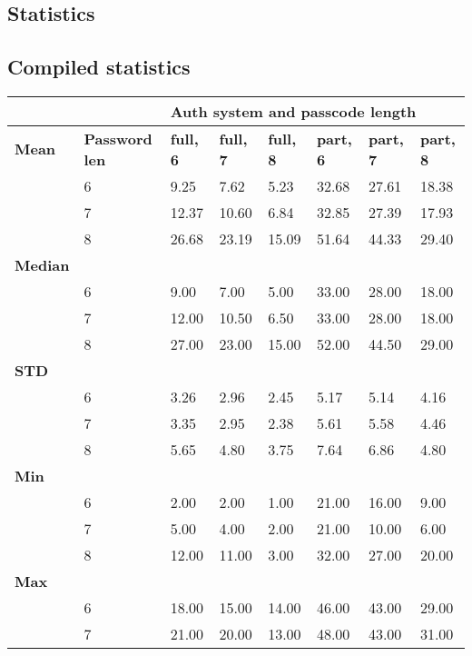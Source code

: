 \documentclass[british,11pt,a4paper]{article}
\begin{document}
\begin{appendices}
	\section{Statistics}\label{app:extra_stats}
	\subsection{Compiled statistics}
	\begin{table}[!htb]
		\centering
		\begin{tabular}{|l|l|l|l|l|l|l|l|}
		\hline
		& & \multicolumn{6}{l|}{\textbf{Auth system and passcode length}} \\ \hline
		\textbf{Mean} & \textbf{Password len} & \textbf{full, 6} & \textbf{full, 7} & \textbf{full, 8} & \textbf{part, 6} & \textbf{part, 7} & \textbf{part, 8} \\ \hline
		 & 6 & 9.25 & 7.62 & 5.23 & 32.68 & 27.61 & 18.38 \\ \hline
		 & 7 & 12.37 & 10.60 & 6.84 & 32.85 & 27.39 & 17.93 \\ \hline
		 & 8 & 26.68 & 23.19 & 15.09 & 51.64 & 44.33 & 29.40 \\ \hline
		\textbf{Median} &  &  &  &  &  &  &  \\ \hline
		 & 6 & 9.00 & 7.00 & 5.00 & 33.00 & 28.00 & 18.00 \\ \hline
		 & 7 & 12.00 & 10.50 & 6.50 & 33.00 & 28.00 & 18.00 \\ \hline
		 & 8 & 27.00 & 23.00 & 15.00 & 52.00 & 44.50 & 29.00 \\ \hline
		\textbf{STD} &  &  &  &  &  &  &  \\ \hline
		 & 6 & 3.26 & 2.96 & 2.45 & 5.17 & 5.14 & 4.16 \\ \hline
		 & 7 & 3.35 & 2.95 & 2.38 & 5.61 & 5.58 & 4.46 \\ \hline
		 & 8 & 5.65 & 4.80 & 3.75 & 7.64 & 6.86 & 4.80 \\ \hline
		\textbf{Min} &  &  &  &  &  &  &  \\ \hline
		 & 6 & 2.00 & 2.00 & 1.00 & 21.00 & 16.00 & 9.00 \\ \hline
		 & 7 & 5.00 & 4.00 & 2.00 & 21.00 & 10.00 & 6.00 \\ \hline
		 & 8 & 12.00 & 11.00 & 3.00 & 32.00 & 27.00 & 20.00 \\ \hline
		\textbf{Max} &  &  &  &  &  &  &  \\ \hline
		 & 6 & 18.00 & 15.00 & 14.00 & 46.00 & 43.00 & 29.00 \\ \hline
		 & 7 & 21.00 & 20.00 & 13.00 & 48.00 & 43.00 & 31.00 \\ \hline

\end{tabular}
\end{table}
\end{appendices}
\end{document}
